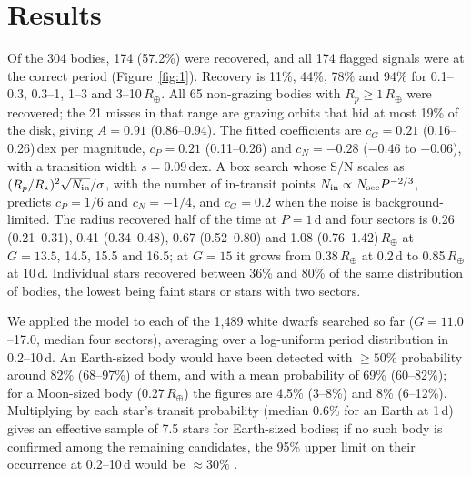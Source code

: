 \documentclass[RNAAS]{aastex631}
\begin{document}
\section{Results}
Of the 304 bodies, 174 (57.2\%) were recovered, and all 174 flagged signals were at the correct period
(Figure~\ref{fig:1}). Recovery is 11\%, 44\%, 78\% and 94\% for 0.1--0.3, 0.3--1, 1--3 and 3--10\,$R_\oplus$. All 65
non-grazing bodies with $R_p\geq1\,R_\oplus$ were recovered; the 21 misses in that range are grazing orbits that hid at
most 19\% of the disk, giving $A=0.91$ (0.86--0.94). The fitted coefficients are $c_G=0.21$ (0.16--0.26)\,dex per
magnitude, $c_P=0.21$ (0.11--0.26) and $c_N=-0.28$ ($-0.46$ to $-0.06$), with a transition width $s=0.09$\,dex. A box
search whose S/N scales as $(R_p/R_\star)^2\sqrt{N_{\rm in}}/\sigma$, with the number of in-transit points
$N_{\rm in}\propto N_{\rm sec}P^{-2/3}$, predicts $c_P=1/6$ and $c_N=-1/4$, and $c_G=0.2$ when the noise is
background-limited. The radius recovered half of the time at $P=1$\,d and four sectors is 0.26 (0.21--0.31), 0.41
(0.34--0.48), 0.67 (0.52--0.80) and 1.08 (0.76--1.42)\,$R_\oplus$ at $G=13.5$, 14.5, 15.5 and 16.5; at $G=15$ it grows
from 0.38\,$R_\oplus$ at 0.2\,d to 0.85\,$R_\oplus$ at 10\,d. Individual stars recovered between 36\% and 80\% of the
same distribution of bodies, the lowest being faint stars or stars with two sectors.

We applied the model to each of the 1,489 white dwarfs searched so far ($G=11.0$--17.0, median four sectors),
averaging over a log-uniform period distribution in 0.2--10\,d. An Earth-sized body would have been detected with
$\geq50\%$ probability around 82\% (68--97\%) of them, and with a mean probability of 69\% (60--82\%); for a Moon-sized
body (0.27\,$R_\oplus$) the figures are 4.5\% (3--8\%) and 8\% (6--12\%). Multiplying by each star's transit
probability (median 0.6\% for an Earth at 1\,d) gives an effective sample of 7.5 stars for Earth-sized bodies; if no
such body is confirmed among the remaining candidates, the 95\% upper limit on their occurrence at 0.2--10\,d would
be $\approx30\%$ \citep[eq.~7 of][]{vansluijs2018}.
\end{document}
